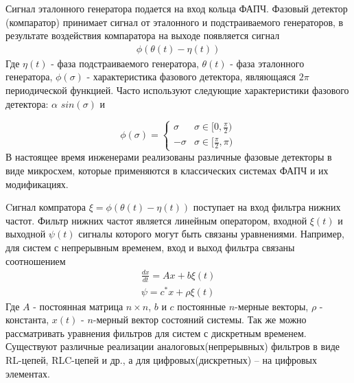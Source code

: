 \documentclass[a4paper,14pt]{extarticle} %
\begin{document}
Сигнал эталонного генератора подается на вход кольца ФАПЧ. Фазовый детектор (компаратор) принимает сигнал от эталонного и подстраиваемого генераторов, в результате воздействия компаратора на выходе появляется сигнал
 \begin{equation*}
 \begin{aligned}
\phi(\theta(t) - \eta(t))
 \end{aligned}
\end{equation*}
Где $\eta(t)$ - фаза подстраиваемого генератора, $\theta(t)$ - фаза эталонного генератора, $\phi(\sigma)$ - характеристика фазового детектора, являющаяся $2\pi$ периодической функцией. Часто используют следующие характеристики фазового детектора: $\alpha$ $sin(\sigma)$ и 

\begin{equation*}
\phi(\sigma) = 
 \begin{cases}
   \sigma &\text{$\sigma \in [0,  \frac{\pi}{2})$}\\
   -\sigma &\text{$\sigma \in [\frac{\pi}{2},  \pi)$}
 \end{cases}
\end{equation*}
В настоящее время инженерами реализованы различные фазовые детекторы в виде микросхем, которые применяются в классических системах ФАПЧ и их модификациях.

Cигнал компратора $\xi = \phi(\theta(t) - \eta(t))$ поступает на вход фильтра нижних частот. Фильтр нижних частот является линейным оператором, входной $\xi(t)$ и выходной $\psi(t)$ сигналы которого могут быть связаны уравнениями. Например, для систем с непрерывным временем, вход и выход  фильтра связаны соотношением 
 \begin{equation*}
 \begin{aligned}
\frac{dx}{dt} = Ax + b\xi(t) \\
\psi = c^*x + \rho\xi(t)
 \end{aligned}
\end{equation*}
Где $A$ - постоянная матрица $n \times n$, $b$ и $c$ постоянные $n$-мерные векторы, $\rho$ - константа, $x(t)$ - $n$-мерный вектор состояний системы. Так же можно рассматривать уравнения фильтров для систем с дискретным временем. Существуют различные реализации аналоговых(непрерывных) фильтров в виде RL-цепей, RLC-цепей и др., а для цифровых(дискретных) -- на цифровых элементах.

\newpage
\end{document}
